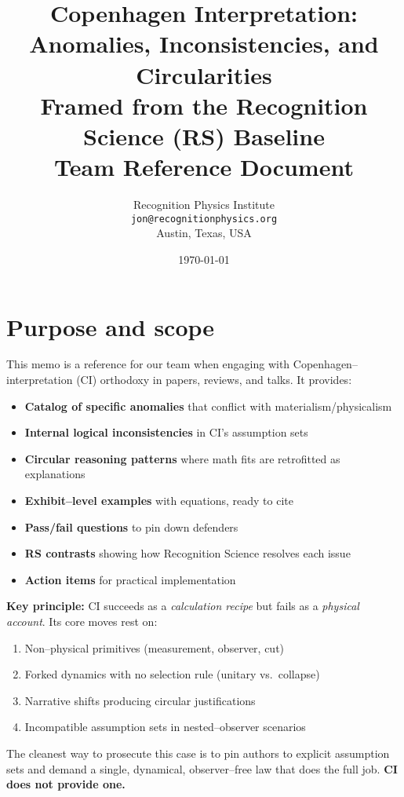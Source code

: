 \documentclass[11pt]{article}
\title{\textbf{Copenhagen Interpretation:\\Anomalies, Inconsistencies, and Circularities}\\[6pt]
\large Framed from the Recognition Science (RS) Baseline\\[4pt]
\normalsize Team Reference Document}
\author{Recognition Physics Institute\\
\texttt{jon@recognitionphysics.org}\\
Austin, Texas, USA}
\date{\today}
\begin{document}
\maketitle

\tableofcontents
\newpage

\section{Purpose and scope}

This memo is a reference for our team when engaging with Copenhagen--interpretation (CI) orthodoxy in papers, reviews, and talks. It provides:
\begin{itemize}[leftmargin=*]
  \item \textbf{Catalog of specific anomalies} that conflict with materialism/physicalism
  \item \textbf{Internal logical inconsistencies} in CI's assumption sets
  \item \textbf{Circular reasoning patterns} where math fits are retrofitted as explanations
  \item \textbf{Exhibit--level examples} with equations, ready to cite
  \item \textbf{Pass/fail questions} to pin down defenders
  \item \textbf{RS contrasts} showing how Recognition Science resolves each issue
  \item \textbf{Action items} for practical implementation
\end{itemize}

\begin{rsbox}
\textbf{Key principle:} CI succeeds as a \emph{calculation recipe} but fails as a \emph{physical account}. Its core moves rest on:
\begin{enumerate}[nosep]
  \item Non--physical primitives (measurement, observer, cut)
  \item Forked dynamics with no selection rule (unitary vs.\ collapse)
  \item Narrative shifts producing circular justifications
  \item Incompatible assumption sets in nested--observer scenarios
\end{enumerate}
The cleanest way to prosecute this case is to pin authors to explicit assumption sets and demand a single, dynamical, observer--free law that does the full job. \textbf{CI does not provide one.}
\end{rsbox}
\end{document}

